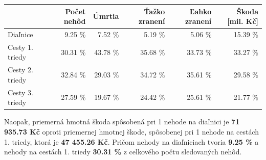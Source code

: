 \documentclass[a4paper, 11pt]{article}
\begin{document}
\begin{center}
	\begin{tabular}{lrrrrr}
	\hline
	                 & Počet nehôd   & Úmrtia   & Ťažko zranení   & Ľahko zranení   & Škoda [mil. Kč]   \\
	\hline
	 Diaľnice        & 9.25 \%        & 7.52 \%   & 5.19 \%          & 5.06 \%          & 15.39 \%           \\
	 Cesty 1. triedy & 30.31 \%       & 43.78 \%  & 35.68 \%         & 33.73 \%         & 33.27 \%           \\
	 Cesty 2. triedy & 32.84 \%       & 29.03 \%  & 34.72 \%         & 35.61 \%         & 29.58 \%           \\
 	Cesty 3. triedy & 27.59 \%       & 19.67 \%  & 24.42 \%         & 25.61 \%         & 21.77 \%           \\
	\hline
	\end{tabular}
	\label{tab_1}
\end{center}

Naopak, priemerná hmotná škoda spôsobená pri 1 nehode na diaľnici je \textbf{71 935.73 Kč} oproti priemernej hmotnej škode, spôsobenej pri 1 nehode na cestách 1. triedy, ktorá je \textbf{47 455.26 Kč}. Pričom nehody na diaľniciach tvoria \textbf{9.25 \%} a nehody na cestách 1. triedy \textbf{30.31 \%} z celkového počtu sledovaných nehôd.
\end{document}
